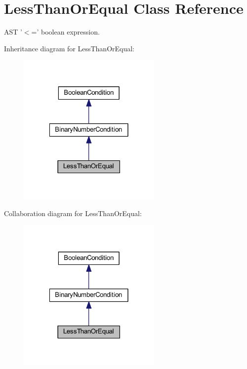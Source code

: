 \hypertarget{class_less_than_or_equal}{\section{Less\-Than\-Or\-Equal Class Reference}
\label{class_less_than_or_equal}
}


A\-S\-T '$<$=' boolean expression.  




Inheritance diagram for Less\-Than\-Or\-Equal\-:\nopagebreak
\begin{figure}[H]
\begin{center}
\leavevmode
\includegraphics[width=198pt]{class_less_than_or_equal__inherit__graph}
\end{center}
\end{figure}


Collaboration diagram for Less\-Than\-Or\-Equal\-:\nopagebreak
\begin{figure}[H]
\begin{center}
\leavevmode
\includegraphics[width=198pt]{class_less_than_or_equal__coll__graph}
\end{center}
\end{figure}
